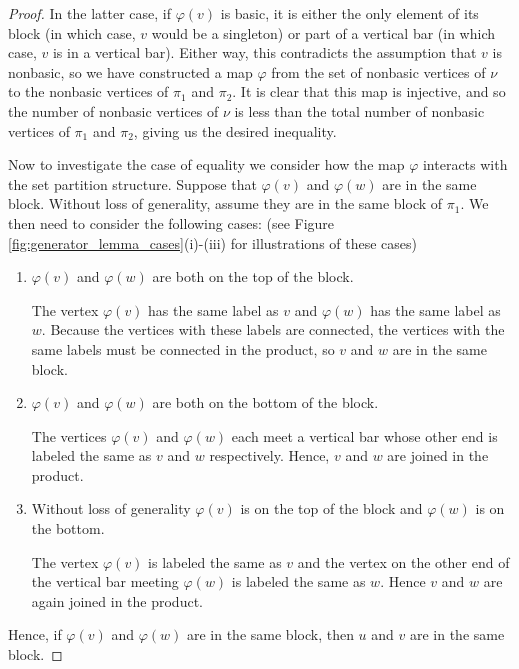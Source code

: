 \documentclass[ALCO,Unicode,published]{cedram}
\begin{document}
\begin{proof}
    In the latter case, if $\varphi(v)$ is basic, it is either the only element of its block (in which case, $v$ would be a singleton) or part of a vertical bar (in which case, $v$ is in a vertical bar). Either way, this contradicts the assumption that $v$ is nonbasic, so we have constructed a map $\varphi$ from the set of nonbasic vertices of $\nu$ to the nonbasic vertices of $\pi_1$ and $\pi_2$. It is clear that this map is injective, and so the number of nonbasic vertices of $\nu$ is less than the total number of nonbasic vertices of 
    $\pi_1$ and $\pi_2$, giving us the desired inequality.

    Now to investigate the case of equality we consider how the map $\varphi$ interacts with the set partition structure. Suppose that $\varphi(v)$ and $\varphi(w)$ are in the same block. Without loss of generality, assume they are in the same block of $\pi_1$. We then need to consider the following cases: (see Figure \ref{fig:generator_lemma_cases}(i)-(iii) for illustrations of these cases)

    \begin{enumerate}
        \item[(i)] $\varphi(v)$ and $\varphi(w)$ are both on the top of the block.

        The vertex $\varphi(v)$ has the same label as $v$ and $\varphi(w)$ has the same label as $w$. Because the vertices with these labels are connected, the vertices with the same labels must be connected in the product, so $v$ and $w$ are in the same block.

        \item[(ii)] $\varphi(v)$ and $\varphi(w)$ are both on the bottom of the block.

        The vertices $\varphi(v)$ and $\varphi(w)$ each meet a vertical bar whose other end is labeled the same as $v$ and $w$ respectively. Hence, $v$ and $w$ are joined in the product.

        \item[(iii)] Without loss of generality $\varphi(v)$ is on the top of the block and $\varphi(w)$ is on the bottom.

        The vertex $\varphi(v)$ is labeled the same as $v$ and the vertex on the other end of the vertical bar meeting $\varphi(w)$ is labeled the same as $w$. Hence $v$ and $w$ are again joined in the product.
    \end{enumerate}

    Hence, if $\varphi(v)$ and $\varphi(w)$ are in the same block, then $u$ and $v$ are in the same block.


\end{proof}
\end{document}
